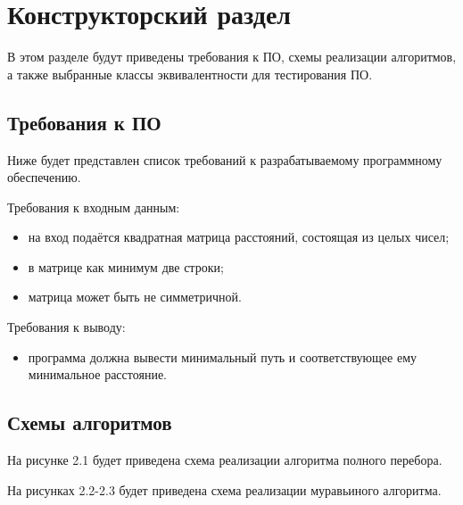 \chapter{Конструкторский раздел}
В этом разделе будут приведены требования к ПО, схемы реализации алгоритмов,
а также выбранные классы эквивалентности для тестирования ПО.

\section{Требования к ПО}
Ниже будет представлен список требований к разрабатываемому программному обеспечению. 

Требования к входным данным: 
\begin{itemize}
	\item на вход подаётся квадратная матрица расстояний, состоящая из целых чисел;
	\item в матрице как минимум две строки;
	\item матрица может быть не симметричной.
\end{itemize}

Требования к выводу: 
\begin{itemize}
	\item программа должна вывести минимальный путь и соответствующее ему минимальное расстояние.
\end{itemize}

\section{Схемы алгоритмов}
На рисунке 2.1 будет приведена схема реализации алгоритма полного перебора.

На рисунках 2.2-2.3 будет приведена схема реализации муравьиного алгоритма.

